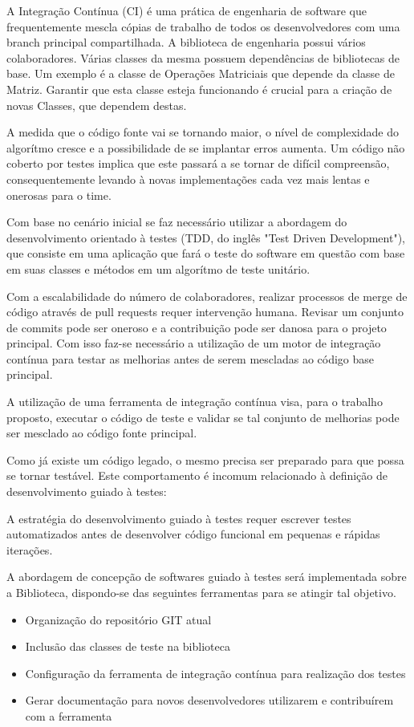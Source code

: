\documentclass[
	article,			%
	12pt,				%
	oneside,			%
	a4paper,			%
	english,			
	brazil,
	sumario=tradicional
	]{abntex2}
\begin{document}
A Integração Contínua (CI) é uma prática de engenharia de software que frequentemente mescla cópias de trabalho de todos os desenvolvedores com uma branch principal compartilhada. \cite{vasilescu2015continuous}
A biblioteca de engenharia possui vários colaboradores. Várias classes da mesma possuem dependências de bibliotecas de base. Um exemplo é a classe de Operações Matriciais que depende da classe de Matriz. Garantir que esta classe esteja funcionando é crucial para a criação de novas Classes, que dependem destas.

A medida que o código fonte vai se tornando maior, o nível de complexidade do algorítmo cresce e a possibilidade de se implantar erros aumenta. Um código não coberto por testes implica que este passará a se tornar de difícil compreensão, consequentemente levando à novas implementações cada vez mais lentas e onerosas para o time.

Com base no cenário inicial se faz necessário utilizar a abordagem do desenvolvimento orientado à testes (TDD, do inglês "Test Driven Development"), que consiste em uma aplicação que fará o teste do software em questão com base em suas classes e métodos em um algorítmo de teste unitário.

Com a escalabilidade do número de colaboradores, realizar processos de merge de código através de pull requests requer intervenção humana. Revisar um conjunto de commits pode ser oneroso e a contribuição pode ser danosa para o projeto principal. Com isso faz-se necessário a utilização de um motor de integração contínua para testar as melhorias antes de serem mescladas ao código base principal.

A utilização de uma ferramenta de integração contínua visa, para o trabalho proposto, executar o código de teste e validar se tal conjunto de melhorias pode ser mesclado ao código fonte principal.

Como já existe um código legado, o mesmo precisa ser preparado para que possa se tornar testável. Este comportamento é incomum relacionado à definição de desenvolvimento guiado à testes:

A estratégia do desenvolvimento guiado à testes requer escrever testes automatizados antes de desenvolver código funcional em pequenas e rápidas iterações. \cite{testdrivendevelopment.1}

A abordagem de concepção de softwares guiado à testes será implementada sobre a Biblioteca, dispondo-se das seguintes ferramentas para se atingir tal objetivo.

\begin{itemize}
	\item{Organização do repositório GIT atual}
	\item{Inclusão das classes de teste na biblioteca}
	\item{Configuração da ferramenta de integração contínua para realização dos testes}
	\item{Gerar documentação para novos desenvolvedores utilizarem e contribuírem com a ferramenta}
\end{itemize}
\end{document}
